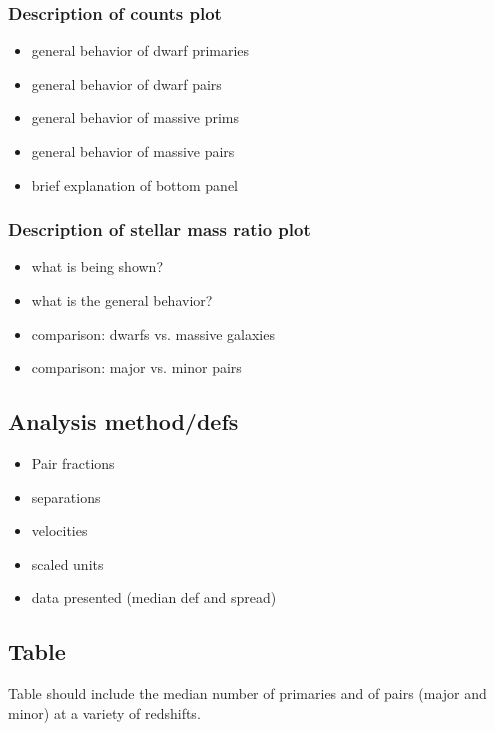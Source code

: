 \documentclass[twocolumn]{aastex631}
\begin{document}
    \subsubsection{Description of counts plot}
            \begin{itemize}
                \item general behavior of dwarf primaries
                \item general behavior of dwarf pairs
                \item general behavior of massive prims
                \item general behavior of massive pairs
                \item brief explanation of bottom panel
            \end{itemize}
    \subsubsection{Description of stellar mass ratio plot}
            \begin{itemize}
                \item what is being shown?
                \item what is the general behavior?
                \item comparison: dwarfs vs. massive galaxies 
                \item comparison: major vs. minor pairs
            \end{itemize}
    
\subsection{Analysis method/defs} \label{sec:methods-analysis}
    \begin{itemize}
        \item Pair fractions
        \item separations
        \item velocities
        \item scaled units
        \item data presented (median def and spread)
    \end{itemize}

\subsection{Table}
Table should include the median number of primaries and of pairs (major and minor) at a variety of redshifts. 
\end{document}
